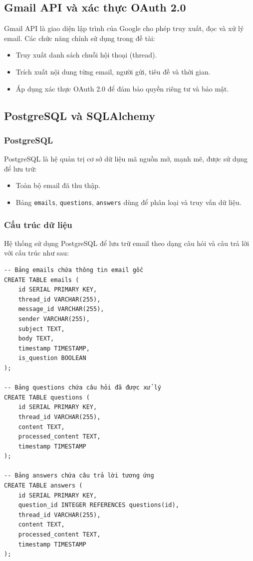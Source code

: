 \documentclass[../DoAn.tex]{subfiles}
\begin{document}
\subsection{Gmail API và xác thực OAuth 2.0}
Gmail API là giao diện lập trình của Google cho phép truy xuất, đọc và xử lý email. Các chức năng chính sử dụng trong đề tài:
\begin{itemize}
    \item Truy xuất danh sách chuỗi hội thoại (thread).
    \item Trích xuất nội dung từng email, người gửi, tiêu đề và thời gian.
    \item Áp dụng xác thực OAuth 2.0 để đảm bảo quyền riêng tư và bảo mật.
\end{itemize}

\subsection{PostgreSQL và SQLAlchemy}

\subsubsection{PostgreSQL}
PostgreSQL là hệ quản trị cơ sở dữ liệu mã nguồn mở, mạnh mẽ, được sử dụng để lưu trữ:
\begin{itemize}
    \item Toàn bộ email đã thu thập.
    \item Bảng \texttt{emails}, \texttt{questions}, \texttt{answers} dùng để phân loại và truy vấn dữ liệu.
\end{itemize}

\subsubsection{Cấu trúc dữ liệu}
Hệ thống sử dụng PostgreSQL để lưu trữ email theo dạng câu hỏi và câu trả lời với cấu trúc như sau:

\begin{verbatim}
-- Bảng emails chứa thông tin email gốc
CREATE TABLE emails (
    id SERIAL PRIMARY KEY,
    thread_id VARCHAR(255),
    message_id VARCHAR(255),
    sender VARCHAR(255),
    subject TEXT,
    body TEXT,
    timestamp TIMESTAMP,
    is_question BOOLEAN
);

-- Bảng questions chứa câu hỏi đã được xử lý
CREATE TABLE questions (
    id SERIAL PRIMARY KEY,
    thread_id VARCHAR(255),
    content TEXT,
    processed_content TEXT,
    timestamp TIMESTAMP
);

-- Bảng answers chứa câu trả lời tương ứng
CREATE TABLE answers (
    id SERIAL PRIMARY KEY,
    question_id INTEGER REFERENCES questions(id),
    thread_id VARCHAR(255),
    content TEXT,
    processed_content TEXT,
    timestamp TIMESTAMP
);
\end{verbatim}
\end{document}
